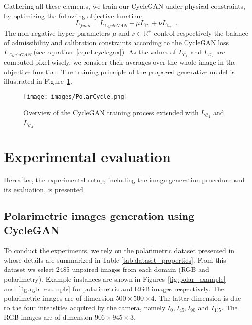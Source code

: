 Gathering all these elements, we train our CycleGAN under physical constraints, by optimizing the following objective function:
\begin{equation}
L_{final}= L_{CycleGAN}+\mu L_{\mathcal{C}_1} + \nu L_{\mathcal{C}_2} \enspace.
\label{eqn:lfinal}
\end{equation}
%
The non-negative hyper-parameters $\mu$ and $\nu \in \mathbb{R}^{+}$ control respectively the balance of admissibility and calibration constraints according to the CycleGAN loss $L_{CycleGAN}$ (see equation~\eqref{eqn:Lcyclegan}). As the values of $L_{\mathcal{C}_1}$ and $L_{\mathcal{C}_2}$ are computed pixel-wisely, we consider their averages over the whole image in the objective function. The training principle of the proposed generative model is illustrated in Figure~\ref{fig:overview_polarCycle}.

\begin{figure} 
	\centering
	\texttt{[image: images/PolarCycle.png]}
	\caption{Overview of the CycleGAN training process extended with $L_{\mathcal{C}_1}$ and $L_{\mathcal{C}_2}$.}
	\label{fig:overview_polarCycle}
\end{figure}


\section{Experimental evaluation}

Hereafter, the experimental setup, including the image generation procedure and its evaluation, is presented. 

\subsection{Polarimetric images generation using CycleGAN} \label{subsec:polar_gen}

To conduct the experiments, we rely on the polarimetric dataset presented in \citep{Blin2020} whose details are summarized in Table \ref{tab:dataset_properties}. From this dataset we select 2485 unpaired images from each domain (RGB and polarimetry). Example instances are shown in Figures~\ref{fig:polar_example} and~\ref{fig:rgb_example}  for polarimetric and RGB images respectively. The polarimetric images are of dimension $500 \times 500 \times 4$. The latter dimension is due to the four intensities acquired by the camera, namely $I_0, I_{45}, I_{90}$ and $I_{135}$. The RGB images are of dimension $906 \times 945 \times 3$.

